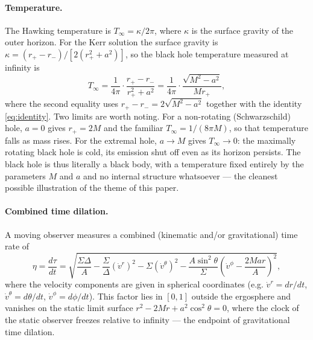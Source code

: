\documentclass[10pt]{article}
\theoremstyle{definition}
\theoremstyle{remark}
\begin{document}
\paragraph{Temperature.} The Hawking temperature is $T_\infty = \kappa/2\pi$, where $\kappa$ is the surface gravity of the outer horizon. For the Kerr solution the surface gravity is $\kappa = (r_+ - r_-)/[2(r_+^2 + a^2)]$, so the black hole temperature measured at infinity is
\begin{equation}\label{eq:kerr-temp}
T_\infty = \frac{1}{4\pi}\cdot\frac{r_+ - r_-}{r_+^2 + a^2} = \frac{1}{4\pi}\cdot\frac{\sqrt{M^2 - a^2}}{M r_+},
\end{equation}
where the second equality uses $r_+ - r_- = 2\sqrt{M^2-a^2}$ together with the identity \eqref{eq:identity}. Two limits are worth noting. For a non-rotating (Schwarzschild) hole, $a = 0$ gives $r_+ = 2M$ and the familiar $T_\infty = 1/(8\pi M)$, so that temperature falls as mass rises. For the extremal hole, $a \to M$ gives $T_\infty \to 0$: the maximally rotating black hole is cold, its emission shut off even as its horizon persists. The black hole is thus literally a black body, with a temperature fixed entirely by the parameters $M$ and $a$ and no internal structure whatsoever --- the cleanest possible illustration of the theme of this paper.






\paragraph{Combined time dilation.} 

A moving observer measures a combined (kinematic and/or gravitational) time rate of
\begin{equation}\label{eq:sigma}
\eta = \frac{d\tau}{dt} = \sqrt{\frac{\Sigma\Delta}{A}
- \frac{\Sigma}{\Delta}\left(\dot v^r\right)^2
- \Sigma\left(\dot v^\theta\right)^2
- \frac{A\sin^2\theta}{\Sigma}\left(\dot v^\phi - \frac{2Mar}{A} \right)^2},
\end{equation}
where the velocity components are given in spherical coordinates (e.g. $\dot v^r = dr/dt$, $\dot v^\theta = d\theta/dt$, $\dot v^\phi = d\phi/dt$).
This factor lies in $[0,1]$ outside the ergosphere and vanishes on the static limit surface $r^2 - 2Mr + a^2\cos^2\theta = 0$, where the clock of the static observer freezes relative to infinity --- the endpoint of gravitational time dilation.
\end{document}
